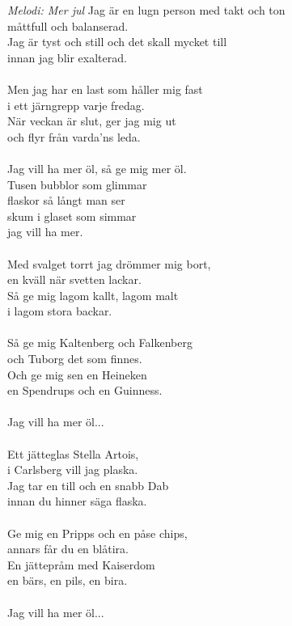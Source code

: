 {\footnotesize\textit{Melodi: Mer jul}}
\vspace{10pt}
Jag är en lugn person med takt och ton\\
måttfull och balanserad.\\
Jag är tyst och still och det skall mycket till\\
innan jag blir exalterad.\\
\\
Men jag har en last som håller mig fast\\
i ett järngrepp varje fredag.\\
När veckan är slut, ger jag mig ut\\
och flyr från varda’ns leda.\\
\\
\revrpt Jag vill ha mer öl, så ge mig mer öl.\rpt\\
Tusen bubblor som glimmar\\
flaskor så långt man ser\\
skum i glaset som simmar\\
jag vill ha mer.\\
\\
Med svalget torrt jag drömmer mig bort,\\
en kväll när svetten lackar.\\
Så ge mig lagom kallt, lagom malt\\
i lagom stora backar.\\
\\
Så ge mig Kaltenberg och Falkenberg\\
och Tuborg det som finnes.\\
Och ge mig sen en Heineken\\
en Spendrups och en Guinness.\\
\\
Jag vill ha mer öl...\\
\\
Ett jätteglas Stella Artois,\\
i Carlsberg vill jag plaska.\\
Jag tar en till och en snabb Dab\\
innan du hinner säga flaska.\\
\\
Ge mig en Pripps och en påse chips,\\
annars får du en blåtira.\\
En jättepråm med Kaiserdom\\
en bärs, en pils, en bira.\\
\\
Jag vill ha mer öl...
